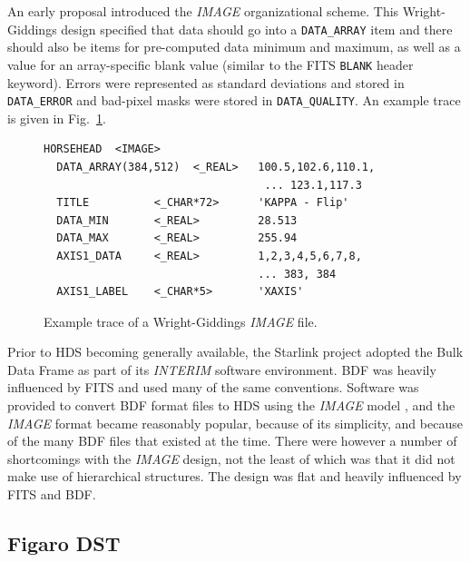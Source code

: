 \documentclass[final,authoryear,5p,times,twocolumn]{elsarticle}
\begin{document}
An early proposal \citep[][but see also \citet{SGP38}]{WrightGiddings1983} introduced the
\emph{IMAGE} organizational scheme. This Wright-Giddings design specified that
data should go into a \texttt{DATA\_ARRAY} item and there should also be
items for pre-computed data minimum and maximum, as well as a value for
an array-specific blank value (similar to the FITS \texttt{BLANK}
header keyword). Errors were represented as standard
deviations and stored in \texttt{DATA\_ERROR} and bad-pixel masks were
stored in \texttt{DATA\_QUALITY}. An example trace is given in Fig.~\ref{fig:image}.

\begin{figure}[t]
\small
\begin{verbatim}
HORSEHEAD  <IMAGE>
  DATA_ARRAY(384,512)  <_REAL>   100.5,102.6,110.1,
                                  ... 123.1,117.3
  TITLE          <_CHAR*72>      'KAPPA - Flip'
  DATA_MIN       <_REAL>         28.513
  DATA_MAX       <_REAL>         255.94
  AXIS1_DATA     <_REAL>         1,2,3,4,5,6,7,8,
                                 ... 383, 384
  AXIS1_LABEL    <_CHAR*5>       'XAXIS'
\end{verbatim}
\caption{Example trace of a Wright-Giddings \emph{IMAGE} file.}
\label{fig:image}
\end{figure}

Prior to HDS becoming generally available, the Starlink project adopted
the Bulk Data Frame \citep[BDF;][]{1980SPIE..264...70P,SUN4} as part
of its \emph{INTERIM} software environment.  BDF was heavily influenced
by FITS and used many of the same conventions.  Software was provided
to convert BDF format files to HDS using the \emph{IMAGE} model
\citep{SUN96}, and
the \emph{IMAGE} format became reasonably popular, because of its
simplicity, and because of the many BDF files that existed at the time.
There were however
a number of shortcomings with the \emph{IMAGE} design, not the least of which was
that it did not make use of hierarchical structures. The design was
flat and heavily influenced by FITS and BDF.

\subsection{Figaro DST}
\label{app:figaro}
\end{document}
